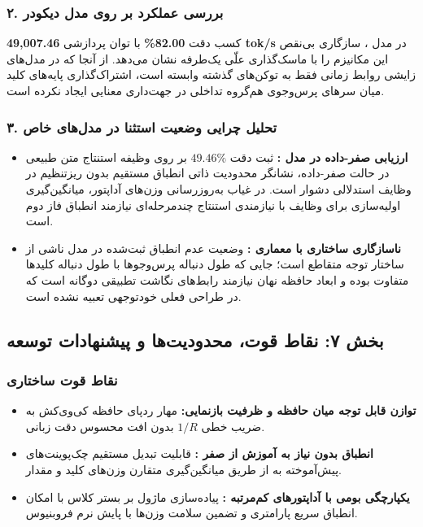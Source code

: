 \subsubsection*{۲. بررسی عملکرد بر روی مدل دیکودر }
کسب دقت \textbf{82.00\%} با توان پردازشی \textbf{49,007.46 tok/s} در مدل ، سازگاری بی‌نقص این مکانیزم را با ماسک‌گذاری علّی یک‌طرفه  نشان می‌دهد. از آنجا که در مدل‌های زایشی روابط زمانی فقط به توکن‌های گذشته وابسته است، اشتراک‌گذاری پایه‌های کلید میان سرهای پرس‌وجوی هم‌گروه تداخلی در جهت‌داری معنایی ایجاد نکرده است.

\subsubsection*{۳. تحلیل چرایی وضعیت استثنا در مدل‌های خاص}
\begin{itemize}
    \item \textbf{ارزیابی صفر-داده در مدل :} ثبت دقت $49.46\%$ بر روی وظیفه استنتاج متن طبیعی  در حالت صفر-داده، نشانگر محدودیت ذاتی انطباق مستقیم بدون ریزتنظیم  در وظایف استدلالی دشوار است. در غیاب به‌روزرسانی وزن‌های آداپتور، میانگین‌گیری اولیه‌سازی برای وظایف با نیازمندی استنتاج چندمرحله‌ای نیازمند انطباق فاز دوم است.
    \item \textbf{ناسازگاری ساختاری با معماری :} وضعیت عدم انطباق ثبت‌شده در مدل  ناشی از ساختار توجه متقاطع  است؛ جایی که طول دنباله پرس‌وجوها با طول دنباله کلیدها متفاوت بوده و ابعاد حافظه نهان نیازمند رابط‌های نگاشت تطبیقی دوگانه است که در طراحی فعلی خودتوجهی تعبیه نشده است.
\end{itemize}

\subsection*{بخش ۷: نقاط قوت، محدودیت‌ها و پیشنهادات توسعه }

\subsubsection*{نقاط قوت ساختاری }
\begin{itemize}
    \item \textbf{توازن قابل توجه میان حافظه و ظرفیت بازنمایی:} مهار ردپای حافظه کی‌وی‌کش به ضریب خطی $1/R$ بدون افت محسوس دقت زبانی.
    \item \textbf{انطباق بدون نیاز به آموزش از صفر :} قابلیت تبدیل مستقیم چک‌پوینت‌های پیش‌آموخته  به  از طریق میانگین‌گیری متقارن وزن‌های کلید و مقدار.
    \item \textbf{یکپارچگی بومی با آداپتورهای کم‌مرتبه :} پیاده‌سازی ماژول بر بستر کلاس  با امکان انطباق سریع پارامتری و تضمین سلامت وزن‌ها با پایش نرم فروبنیوس.
\end{itemize}

